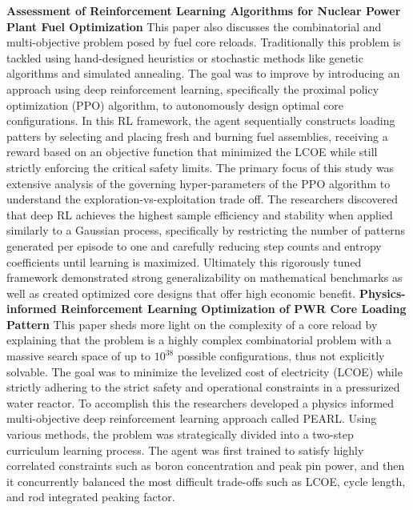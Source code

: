 \documentclass{article}
\begin{document}
\textbf{Assessment of Reinforcement Learning Algorithms for Nuclear Power Plant Fuel Optimization}
\newline
This paper also discusses the combinatorial and multi-objective problem posed by fuel core reloads. Traditionally this problem is tackled using hand-designed heuristics or stochastic methods like genetic algorithms and simulated annealing. The goal was to improve by introducing an approach using deep reinforcement learning, specifically the proximal policy optimization (PPO) algorithm, to autonomously design optimal core configurations. In this RL framework, the agent sequentially constructs loading patters by selecting and placing fresh and burning fuel assemblies, receiving a reward based on an objective function that minimized the LCOE while still strictly enforcing the critical safety limits.
\newline
The primary focus of this study was extensive analysis of the governing hyper-parameters of the PPO algorithm to understand the exploration-vs-exploitation trade off. The researchers discovered that deep RL achieves the highest sample efficiency and stability when applied similarly to a Gaussian process, specifically by restricting the number of patterns generated per episode to one and carefully reducing step counts and entropy coefficients until learning is maximized. Ultimately this rigorously tuned framework demonstrated strong generalizability on mathematical benchmarks as well as created optimized core designs that offer high economic benefit. 
\newline
\textbf{Physics-informed Reinforcement Learning Optimization of PWR Core Loading Pattern}
\newline
This paper sheds more light on the complexity of a core reload by explaining that the problem is a highly complex combinatorial problem with a massive search space of up to $10^{38}$ possible configurations, thus not explicitly solvable. The goal was to minimize the levelized cost of electricity (LCOE) while strictly adhering to the strict safety and operational constraints in a pressurized water reactor. To accomplish this the researchers developed a physics informed multi-objective deep reinforcement learning approach called PEARL. Using various methods, the problem was strategically divided into a two-step curriculum learning process. The agent was first trained to satisfy highly correlated constraints such as boron concentration and peak pin power, and then it concurrently balanced the most difficult trade-offs such as LCOE, cycle length, and rod integrated peaking factor.
\end{document}
